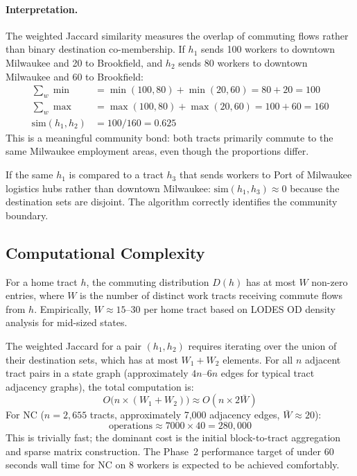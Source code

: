 \paragraph{Interpretation.}
The weighted Jaccard similarity measures the overlap of commuting flows
rather than binary destination co-membership.
If $h_1$ sends 100 workers to downtown Milwaukee and 20 to Brookfield,
and $h_2$ sends 80 workers to downtown Milwaukee and 60 to Brookfield:
\begin{align}
  \sum_w \min &= \min(100, 80) + \min(20, 60) = 80 + 20 = 100 \\
  \sum_w \max &= \max(100, 80) + \max(20, 60) = 100 + 60 = 160 \\
  \mathrm{sim}(h_1, h_2) &= 100 / 160 = 0.625
\end{align}
This is a meaningful community bond: both tracts primarily commute to the same
Milwaukee employment areas, even though the proportions differ.

If the same $h_1$ is compared to a tract $h_3$ that sends workers to
Port of Milwaukee logistics hubs rather than downtown Milwaukee:
$\mathrm{sim}(h_1, h_3) \approx 0$ because the destination sets are
disjoint.
The algorithm correctly identifies the community boundary.

\subsection{Computational Complexity}

For a home tract $h$, the commuting distribution $D(h)$ has at most $W$
non-zero entries, where $W$ is the number of distinct work tracts
receiving commute flows from $h$.
Empirically, $W \approx 15$--$30$ per home tract based on LODES OD
density analysis for mid-sized states.

The weighted Jaccard for a pair $(h_1, h_2)$ requires iterating over the
union of their destination sets, which has at most $W_1 + W_2$ elements.
For all $n$ adjacent tract pairs in a state graph (approximately $4n$--$6n$
edges for typical tract adjacency graphs), the total computation is:
\begin{equation}
  O\!\bigl(n \times (W_1 + W_2)\bigr) \approx O(n \times 2 \bar{W})
\end{equation}
For NC ($n = 2{,}655$ tracts, approximately 7{,}000 adjacency edges,
$\bar{W} \approx 20$):
\begin{equation}
  \text{operations} \approx 7000 \times 40 = 280{,}000
\end{equation}
This is trivially fast; the dominant cost is the initial block-to-tract
aggregation and sparse matrix construction.
The Phase~2 performance target of under 60 seconds wall time for NC on
8 workers is expected to be achieved comfortably.

